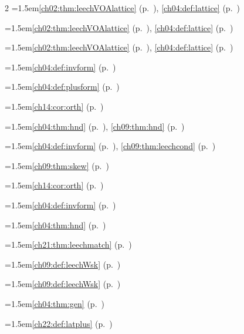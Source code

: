\begin{multicols}{2}
\hangindent=1.5em\quad \ref{ch02:thm:leechVOAlattice} (p.~\pageref{ch02:thm:leechVOAlattice}), \ref{ch04:def:lattice} (p.~\pageref{ch04:def:lattice})\par
\hangindent=1.5em\quad \ref{ch02:thm:leechVOAlattice} (p.~\pageref{ch02:thm:leechVOAlattice}), \ref{ch04:def:lattice} (p.~\pageref{ch04:def:lattice})\par
\hangindent=1.5em\quad \ref{ch02:thm:leechVOAlattice} (p.~\pageref{ch02:thm:leechVOAlattice}), \ref{ch04:def:lattice} (p.~\pageref{ch04:def:lattice})\par
\hangindent=1.5em\quad \ref{ch04:def:invform} (p.~\pageref{ch04:def:invform})\par
\hangindent=1.5em\quad \ref{ch04:def:plusform} (p.~\pageref{ch04:def:plusform})\par
\hangindent=1.5em\quad \ref{ch14:cor:orth} (p.~\pageref{ch14:cor:orth})\par
\hangindent=1.5em\quad \ref{ch04:thm:hnd} (p.~\pageref{ch04:thm:hnd}), \ref{ch09:thm:hnd} (p.~\pageref{ch09:thm:hnd})\par
\hangindent=1.5em\quad \ref{ch04:def:invform} (p.~\pageref{ch04:def:invform}), \ref{ch09:thm:leechcond} (p.~\pageref{ch09:thm:leechcond})\par
\hangindent=1.5em\quad \ref{ch09:thm:skew} (p.~\pageref{ch09:thm:skew})\par
\hangindent=1.5em\quad \ref{ch14:cor:orth} (p.~\pageref{ch14:cor:orth})\par
\hangindent=1.5em\quad \ref{ch04:def:invform} (p.~\pageref{ch04:def:invform})\par
\hangindent=1.5em\quad \ref{ch04:thm:hnd} (p.~\pageref{ch04:thm:hnd})\par
\hangindent=1.5em\quad \ref{ch21:thm:leechmatch} (p.~\pageref{ch21:thm:leechmatch})\par
\hangindent=1.5em\quad \ref{ch09:def:leechWsk} (p.~\pageref{ch09:def:leechWsk})\par
\hangindent=1.5em\quad \ref{ch09:def:leechWsk} (p.~\pageref{ch09:def:leechWsk})\par
\hangindent=1.5em\quad \ref{ch04:thm:gen} (p.~\pageref{ch04:thm:gen})\par
\hangindent=1.5em\quad \ref{ch22:def:latplus} (p.~\pageref{ch22:def:latplus})\par

\end{multicols}
